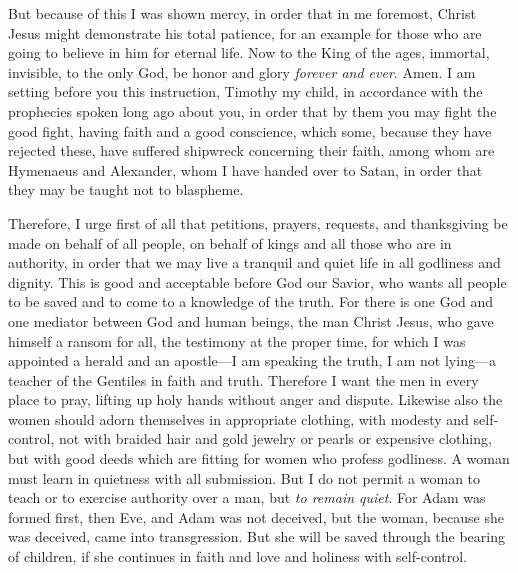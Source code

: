 \begin{biblechapter}
\verse But because of this I was shown mercy, in order that in me foremost, Christ Jesus might demonstrate his total patience, for an example for those who are going to believe in him for eternal life.
\verse Now to the King of the ages, immortal, invisible, to the only God, be honor and glory \textit{forever and ever}. Amen.
 I am setting before you this instruction, Timothy my child, in accordance with the prophecies spoken long ago about you, in order that by them you may fight the good fight,
\verse having faith and a good conscience, which some, because they have rejected these, have suffered shipwreck concerning their faith,
\verse among whom are Hymenaeus and Alexander, whom I have handed over to Satan, in order that they may be taught not to blaspheme.
\end{biblechapter}

\begin{biblechapter} %
 Therefore, I urge first of all that petitions, prayers, requests, and thanksgiving be made on behalf of all people,
\verse on behalf of kings and all those who are in authority, in order that we may live a tranquil and quiet life in all godliness and dignity.
\verse This is good and acceptable before God our Savior,
\verse who wants all people to be saved and to come to a knowledge of the truth.
\verse For there is one God and one mediator between God and human beings, the man Christ Jesus,
\verse who gave himself a ransom for all, the testimony at the proper time,
\verse for which I was appointed a herald and an apostle—I am speaking the truth, I am not lying—a teacher of the Gentiles in faith and truth.
\verse Therefore I want the men in every place to pray, lifting up holy hands without anger and dispute.
 Likewise also the women should adorn themselves in appropriate clothing, with modesty and self-control, not with braided hair and gold jewelry or pearls or expensive clothing,
\verse but with good deeds which are fitting for women who profess godliness.
\verse A woman must learn in quietness with all submission.
\verse But I do not permit a woman to teach or to exercise authority over a man, but \textit{to remain quiet}.
\verse For Adam was formed first, then Eve,
\verse and Adam was not deceived, but the woman, because she was deceived, came into transgression.
\verse But she will be saved through the bearing of children, if she continues in faith and love and holiness with self-control.
\end{biblechapter}

